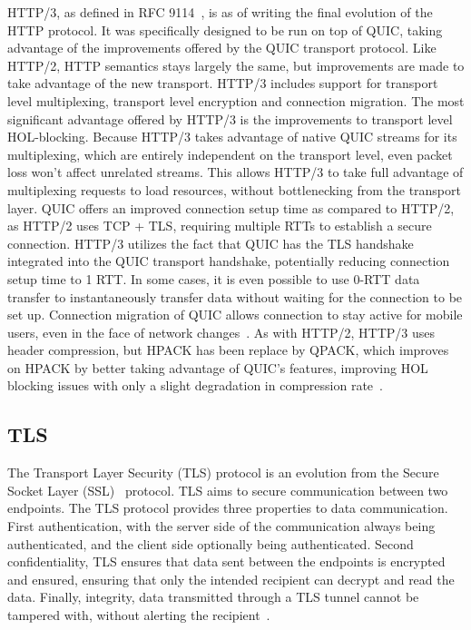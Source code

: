 \documentclass[english, 12pt, a4paper, elec, utf8, a-2b, online]{aaltothesis}
\begin{document}
HTTP/3, as defined in RFC 9114~\cite{rfc9114}, is as of writing the final evolution
of the HTTP protocol. It was specifically designed to be run on top of QUIC,
taking advantage of the improvements offered by the QUIC transport protocol. Like HTTP/2,
HTTP semantics stays largely the same, but improvements are made to take advantage
of the new transport. HTTP/3 includes support for transport level multiplexing,
transport level encryption and connection migration. The most significant advantage
offered by HTTP/3 is the improvements to transport level HOL-blocking. Because HTTP/3
takes advantage of native QUIC streams for its multiplexing, which are entirely independent
on the transport level, even packet loss won't affect unrelated streams. This allows
HTTP/3 to take full advantage of multiplexing requests to load resources, without
bottlenecking from the transport layer. QUIC offers an improved connection setup
time as compared to HTTP/2, as HTTP/2 uses TCP + TLS, requiring multiple RTTs to
establish a secure connection. HTTP/3 utilizes the fact that QUIC has the TLS
handshake integrated into the QUIC transport handshake, potentially reducing
connection setup time to 1 RTT. In some cases, it is even possible to use 0-RTT
data transfer to instantaneously transfer data without waiting for the connection
to be set up. Connection migration of QUIC allows connection to stay active for mobile
users, even in the face of network changes~\cite{rfc9114}. As with HTTP/2, HTTP/3 uses header compression,
but HPACK has been replace by QPACK, which improves on HPACK by better taking advantage
of QUIC's features, improving HOL blocking issues with only a slight degradation
in compression rate~\cite{rfc9204}.


\subsection{TLS}
\label{sec:tls}
The Transport Layer  Security (TLS) protocol is an evolution from the Secure Socket Layer (SSL)~\cite{rfc6101} protocol.
TLS aims to secure communication between two endpoints. The TLS protocol provides three
properties to data communication. First authentication, with the server side of the
communication always being authenticated, and the client side optionally being
authenticated. Second confidentiality, TLS ensures that data sent between the
endpoints is encrypted and ensured, ensuring that only the intended recipient can
decrypt and read the data. Finally, integrity, data transmitted through
a TLS tunnel cannot be tampered with, without alerting the recipient~\cite{rfc8446}.
\end{document}
